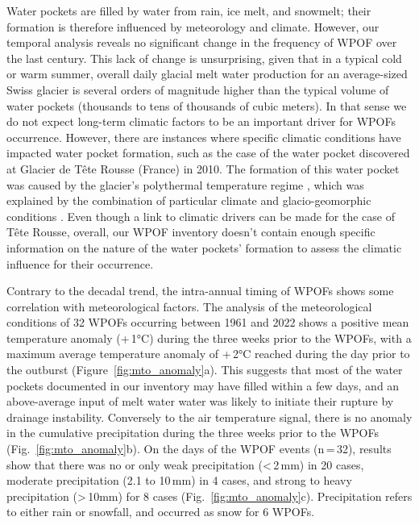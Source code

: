 Water pockets are filled by water from rain, ice melt, and snowmelt; their formation is therefore influenced by meteorology and climate. However, our temporal analysis reveals no significant change in the frequency of WPOF over the last century. This lack of change is unsurprising, given that in a typical cold or warm summer, overall daily glacial melt water production \citep[cf.][]{cremona&al2023} for an average-sized Swiss glacier is several orders of magnitude higher than the typical volume of water pockets (thousands to tens of thousands of cubic meters). In that sense we do not expect long-term climatic factors to be an important driver for WPOFs occurrence. However, there are instances where specific climatic conditions have impacted water pocket formation, such as the case of the water pocket discovered at Glacier de Tête Rousse (France) in 2010. The formation of this water pocket was caused by the glacier's polythermal temperature regime \citep{Vincent&al2012}, which was explained by the combination of particular climate and glacio-geomorphic conditions \citep[see][]{Gilbert&al2012}. Even though a link to climatic drivers can be made for the case of Tête Rousse, overall, our WPOF inventory doesn't contain enough specific information on the nature of the water pockets' formation to assess the climatic influence for their occurrence. 

Contrary to the decadal trend, the intra-annual timing of WPOFs shows some correlation with meteorological factors. The analysis of the meteorological conditions of 32 WPOFs occurring between 1961 and 2022 shows a positive mean temperature anomaly (+\,1°C) during the three weeks prior to the WPOFs, with a maximum average temperature anomaly of +\,2°C reached during the day prior to the outburst (Figure~\ref{fig:mto_anomaly}a). This suggests that most of the water pockets documented in our inventory may have filled within a few days, and an above-average input of melt water water was likely to initiate their rupture by drainage instability. Conversely to the air temperature signal, there is no anomaly in the cumulative precipitation during the three weeks prior to the WPOFs (Fig.~\ref{fig:mto_anomaly}b). On the days of the WPOF events (n\,=\,32), results show that there was no or only weak precipitation (<\,2\,mm) in  20 cases, moderate precipitation (2.1 to 10\,mm) in 4 cases, and strong to heavy precipitation (>\,10mm) for 8 cases (Fig.~\ref{fig:mto_anomaly}c). Precipitation refers to either rain or snowfall, and occurred as snow for 6 WPOFs. 



